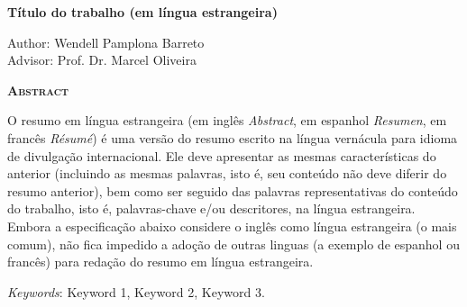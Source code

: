 \begin{center}
	{\Large{\textbf{Título do trabalho (em língua estrangeira)}}}
\end{center}

\vspace{1cm}

\begin{flushright}
	Author: Wendell Pamplona Barreto\\
	Advisor: Prof. Dr. Marcel Oliveira
\end{flushright}

\vspace{1cm}

\begin{center}
	\Large{\textsc{\textbf{Abstract}}}
\end{center}

\noindent O resumo em língua estrangeira (em inglês \textit{Abstract}, em espanhol \textit{Resumen}, em francês \textit{Résumé}) é uma versão do resumo escrito na língua vernácula para idioma de divulgação internacional. Ele deve apresentar as mesmas características do anterior (incluindo as mesmas palavras, isto é, seu conteúdo não deve diferir do resumo anterior), bem como ser seguido das palavras representativas do conteúdo do trabalho, isto é, palavras-chave e/ou descritores, na língua estrangeira. Embora a especificação abaixo considere o inglês como língua estrangeira (o mais comum), não fica impedido a adoção de outras linguas (a exemplo de espanhol ou francês) para redação do resumo em língua estrangeira.

\noindent\textit{Keywords}: Keyword 1, Keyword 2, Keyword 3.